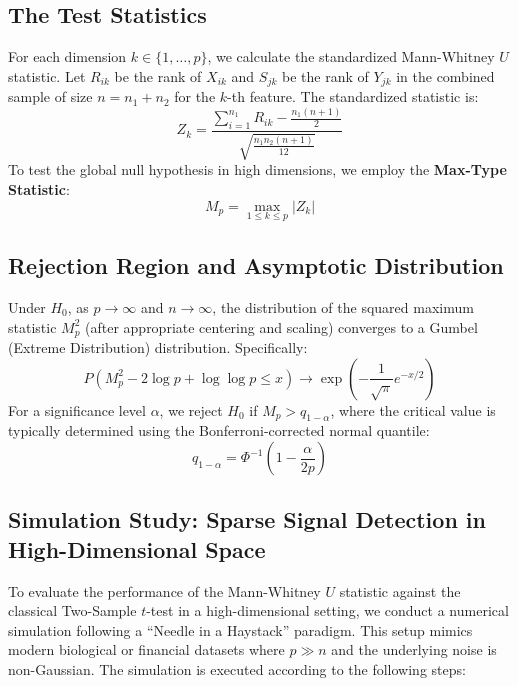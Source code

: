 \documentclass[10pt]{article}
\begin{document}
\subsection{The Test Statistics}
For each dimension $k \in \{1, \dots, p\}$, we calculate the standardized Mann-Whitney $U$ statistic. Let $R_{ik}$ be the rank of $X_{ik}$ and $S_{jk}$ be the rank of $Y_{jk}$ in the combined sample of size $n = n_1 + n_2$ for the $k$-th feature. The standardized statistic is:
$$ Z_k = \frac{\sum_{i=1}^{n_1} R_{ik} - \frac{n_1(n+1)}{2}}{\sqrt{\frac{n_1 n_2 (n+1)}{12}}} $$
To test the global null hypothesis in high dimensions, we employ the \textbf{Max-Type Statistic}:
$$ M_p = \max_{1 \le k \le p} |Z_k| $$

\subsection{Rejection Region and Asymptotic Distribution}
Under $H_0$, as $p \to \infty$ and $n \to \infty$, the distribution of the squared maximum statistic $M_p^2$ (after appropriate centering and scaling) converges to a Gumbel (Extreme Distribution) distribution. Specifically:
$$ P(M_p^2 - 2 \log p + \log \log p \le x) \to \exp\left( -\frac{1}{\sqrt{\pi}} e^{-x/2} \right) $$
For a significance level $\alpha$, we reject $H_0$ if $M_p > q_{1-\alpha}$, where the critical value is typically determined using the Bonferroni-corrected normal quantile:
$$ q_{1-\alpha} = \Phi^{-1} \left( 1 - \frac{\alpha}{2p} \right) $$

\subsection{Simulation Study: Sparse Signal Detection in High-Dimensional Space}

To evaluate the performance of the Mann-Whitney $U$ statistic against the classical Two-Sample $t$-test in a high-dimensional setting, we conduct a numerical simulation following a ``Needle in a Haystack'' paradigm. This setup mimics modern biological or financial datasets where $p \gg n$ and the underlying noise is non-Gaussian.
The simulation is executed according to the following steps:
\end{document}
